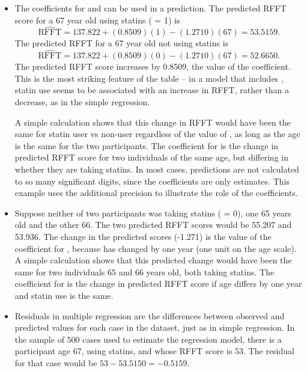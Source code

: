 \begin{itemize}
	
	\item The coefficients for  and  can be used in a prediction.  The predicted RFFT score for a 67 year old using statins ( = 1) is 
	\[
	 \widehat{\text{RFFT}} = 137.822 + (0.8509)(1) - (1.2710)(67) = 53.5159.
	\]
The predicted RFFT for a 67 year old not using statins is
	\[
	 \widehat{\text{RFFT}} = 137.822 + (0.8509)(0) - (1.2710)(67) = 52.6650.
	\]
    The predicted RFFT score increases by 0.8509, the value of the  coefficient.  This is the most striking feature of the table -- in a model that includes , statin use seems to be associated with an increase in RFFT, rather than a decrease, as in the simple regression.

A simple calculation shows that this change in RFFT would have been the same for statin user vs non-user regardless of the value of , as long as the age is the same for the two participants. The coefficient for  is the change in predicted RFFT score for two individuals of the same age, but differing in whether they are taking statins.  In most cases, predictions are not calculated to so many significant digits, since the coefficients are only estimates.  This example uses the additional precision to illustrate the role of the coefficients.
	
	\item  Suppose neither of two participants was taking statins ( = 0), one 65 years old and the other 66.  The two predicted RFFT scores would be  55.207 and 53.936. The change in the predicted scores (-1.271) is the value of the coefficient for , because  has changed by one year (one unit on the age scale).   A simple calculation shows that this predicted change would have been the same for two individuals 65 and 66 years old, both taking statins.  The coefficient for  is the change in predicted RFFT score if age differs by one year and statin use is the same.
	
	\item Residuals in multiple regression are the differences between observed and predicted values for each case in the dataset, just as in simple regression.  In the sample of 500 cases used to estimate the regression model, there is a participant age 67, using statins, and whose RFFT score is 53.  The residual for that case would be $53 - 53.5150 = - 0.5159$.
	

\end{itemize}
